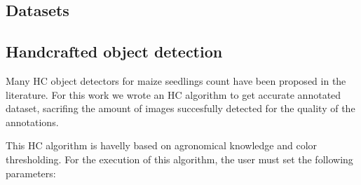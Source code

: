 \documentclass[journal,article,submit,pdftex,moreauthors]{Definitions/mdpi}
\begin{document}
\subsection{Datasets}

\subsection{Handcrafted object detection}

Many HC object detectors for maize seedlings count have been proposed 
in the literature. For this work we wrote an HC algorithm to get accurate 
annotated dataset, sacrifing the amount of images succesfully detected
for the quality of the annotations.

This HC algorithm is havelly based on agronomical knowledge and color thresholding.
For the execution of this algorithm, the user must set the following parameters:
\end{document}
